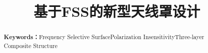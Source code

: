 \documentclass[withoutpreface,bwprint]{cumcmthesis} %
\title{基于FSS的新型天线罩设计}
\begin{document}
 \maketitle
 \begin{abstract}
\end{abstract}

\renewcommand{\abstractname}{Abstract}
\renewcommand{\keywords}{\textbf{Keywords：}}
\newpage

\begin{abstract}
\begin{spacing}{1.6}


\end{spacing}
\noindent\keywords{Frequency Selective Surface\quad Polarization Insensitivity\quad Three-layer Composite Structure}
\end{abstract}

\newpage
\tableofcontents
\newpage


 





\newpage
\begin{thebibliography}{99}
\end{thebibliography}

%
%
%
\end{document}
